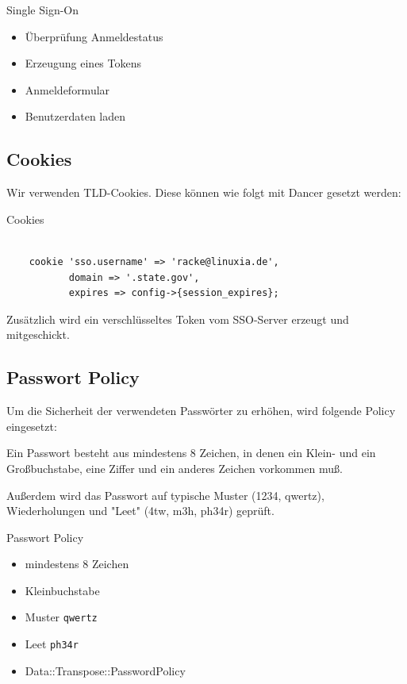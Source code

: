 \begin{frame}{Single Sign-On}
\begin{itemize}
\item Überprüfung Anmeldestatus
\item Erzeugung eines Tokens
\item Anmeldeformular
\item Benutzerdaten laden
\end{itemize}
\end{frame}

\subsection{Cookies}

Wir verwenden TLD-Cookies. Diese können wie folgt mit Dancer
gesetzt werden:

\begin{frame}[fragile]{Cookies}
\begin{lstlisting}

    cookie 'sso.username' => 'racke@linuxia.de',
           domain => '.state.gov',
           expires => config->{session_expires};

\end{lstlisting}
\end{frame}

Zusätzlich wird ein verschlüsseltes Token vom SSO-Server
erzeugt und mitgeschickt.                       
                       
\subsection{Passwort Policy}

Um die Sicherheit der verwendeten Passwörter zu erhöhen, wird
folgende Policy eingesetzt:

Ein Passwort besteht aus mindestens 8 Zeichen, in denen
ein Klein- und ein Großbuchstabe, eine Ziffer und ein
anderes Zeichen vorkommen muß.

Außerdem wird das Passwort auf typische Muster (1234, qwertz),
Wiederholungen und "Leet" (4tw, m3h, ph34r) geprüft.

\begin{frame}[fragile]{Passwort Policy}
\begin{itemize}
\item mindestens 8 Zeichen
\item Kleinbuchstabe
\item Muster \verb|qwertz|
\item Leet \verb|ph34r|
\item Data::Transpose::PasswordPolicy
\end{itemize}
\end{frame}


